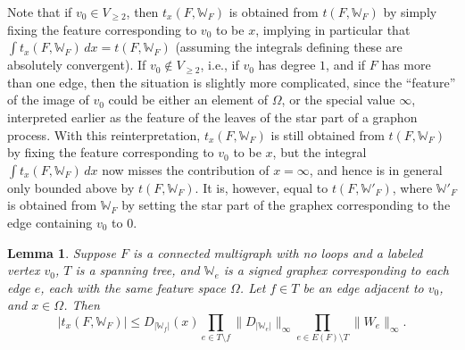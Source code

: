 \documentclass{amsart}
\numberwithin{equation}{section}
\numberwithin{figure}{section}
\newtheorem{lemma}[theorem]{Lemma}
\theoremstyle{definition}
\theoremstyle{remark}
\newcommand{\cW}{\mathbb{W}}
\begin{document}
Note that if $v_0\in V_{\geq2}$, then $ t_x(F,\cW_F)$ is obtained from $
t(F,\cW_F)$ by simply fixing the feature corresponding to $v_0$ to be $x$,
implying in particular that $\int t_x(F,\cW_F)\, dx=t(F,\cW_F)$ (assuming the
integrals defining these are absolutely convergent). If $v_0\notin
V_{\geq2}$, i.e., if $v_0$ has degree $1$, and if $F$ has more than one edge,
then the situation is slightly more complicated, since the ``feature'' of the
image of $v_0$ could be either an element of $\Omega$, or the special value
$\infty$, interpreted earlier as the feature of the leaves of the star part
of a graphon process. With this reinterpretation, $ t_x(F,\cW_F)$ is still
obtained from $ t(F,\cW_F)$ by fixing the feature corresponding to $v_0$ to
be $x$, but the integral $\int t_x(F,\cW_F)\, dx$ now misses the contribution
of $x=\infty$, and hence is in general only bounded above by $t(F,\cW_F)$. It
is, however, equal to $t(F,\cW'_F)$, where $\cW'_F$ is obtained from $\cW_F$
by setting the star part of the graphex corresponding to the edge containing
$v_0$ to $0$.

\begin{lemma}
\label{lem:tx-bound} Suppose $F$ is a connected multigraph with no loops and
a labeled vertex $v_0$, $T$ is a spanning tree, and $\cW_e$ is a signed
graphex corresponding to each edge $e$, each with the same feature space
$\Omega$. Let $f \in T$ be an edge adjacent to $v_0$, and $x \in \Omega$.
Then
\[|t_x(F,\cW_{F})| \le D_{|\cW_f|}(x) \prod_{e \in T \setminus f} \|D_{|\cW_e|}\|_\infty \prod_{e \in E(F) \setminus T} \|W_e\|_\infty.
\]
\end{lemma}
\end{document}
